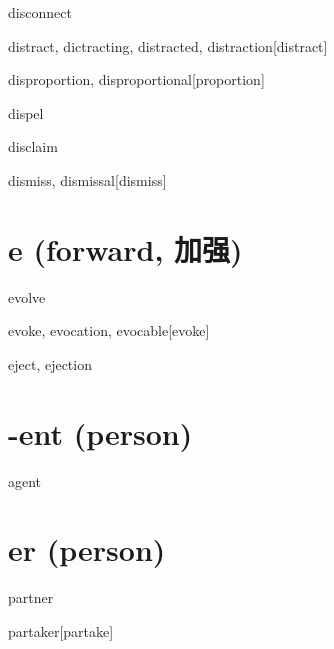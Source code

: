 \begin{RefWord}{disconnect}
\end{RefWord}

\begin{RefWord}{distract, dictracting, distracted, distraction}[distract]
\end{RefWord}

\begin{RefWord}{disproportion, disproportional}[proportion]
\end{RefWord}

\begin{RefWord}{dispel}
\end{RefWord}

\begin{RefWord}{disclaim}
\end{RefWord}

\begin{RefWord}{dismiss, dismissal}[dismiss]
\end{RefWord}

\section{e (forward, 加强)}

\begin{RefWord}{evolve}
\end{RefWord}

\begin{RefWord}{evoke, evocation, evocable}[evoke]
\end{RefWord}

\begin{RefWord}{eject, ejection}
\end{RefWord}

\section{-ent (person)}

\begin{RefWord}{agent}
\end{RefWord}

\section{er (person)}

\begin{RefWord}{partner}
\end{RefWord}

\begin{RefWord}{partaker}[partake]
\end{RefWord}

